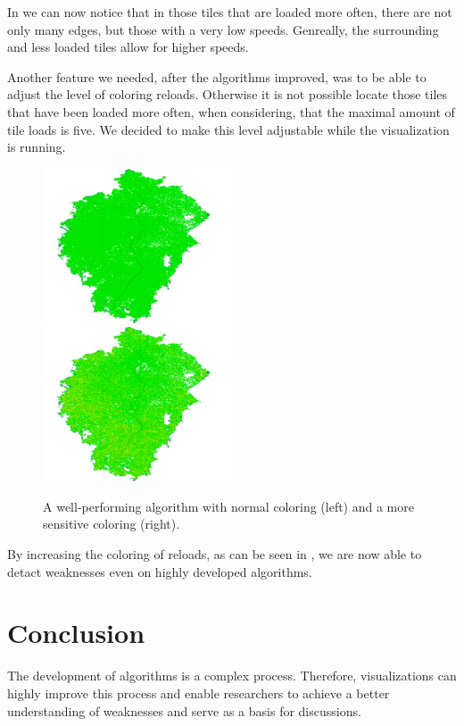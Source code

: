 \documentclass
[
    paper = a4,
    pagesize,
    12 pt,
    oneside,                       %
    open = right,
    DIV = calc,
    BCOR = 0 mm,                   %
    bibtotoc
]
{scrbook}
\begin{document}
In  we can now notice that in those tiles that are loaded more often, there are not only many edges, but those with a very low speeds.
Genreally, the surrounding and less loaded tiles allow for higher speeds.

Another feature we needed, after the algorithms improved, was to be able to adjust the level of coloring reloads.
Otherwise it is not possible locate those tiles that have been loaded more often, when considering, that the maximal amount of tile loads is five.
We decided to make this level adjustable while the visualization is running.

\begin{figure}
    \includegraphics[width=0.5\textwidth]{Images/vis-no-factor.png}
  \includegraphics[width=0.5\textwidth]{Images/vis-factor.png}
\caption[]{A well-performing algorithm with normal coloring (left) and a more sensitive coloring (right).}
\label{fig:factor}
\end{figure}

By increasing the coloring of reloads, as can be seen in , we are now able to detact weaknesses even on highly developed algorithms.

\chapter{Conclusion} \label{conclusion}

The development of algorithms is a complex process.
Therefore, visualizations can highly improve this process and enable researchers to achieve a better understanding of weaknesses and serve as a basis for discussions.
\end{document}
